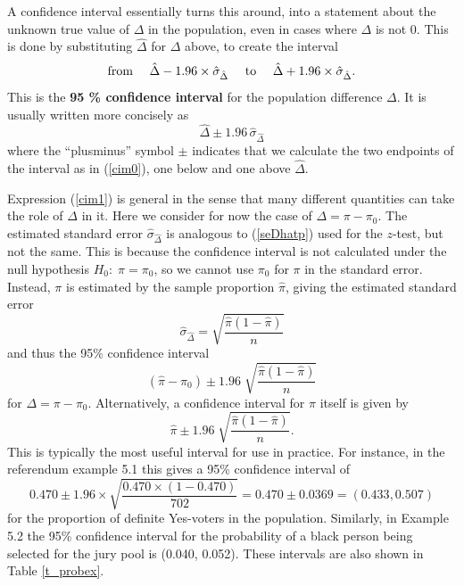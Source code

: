 A confidence interval essentially turns this around, into a statement
about the unknown true value of $\Delta$ in the population, even in
cases where $\Delta$ is not 0.
This is done by substituting $\hat{\Delta}$ for $\Delta$
above, to create the interval
\begin{equation}
\text{from  }\hspace*{1em}
\hat{\Delta} -1.96\times \hat{\sigma}_{\hat{\Delta}}
\hspace*{1em}\text{  to  }\hspace*{1em}
\hat{\Delta}
+1.96\times \hat{\sigma}_{\hat{\Delta}}.
\label{cim0}
\end{equation}
This is the \textbf{95 \% confidence interval} for the population
difference $\Delta$. It is
usually written more concisely as
\begin{equation}
\hat{\Delta}
\pm 1.96\, \hat{\sigma}_{\hat{\Delta}}
\label{cim1}
\end{equation}
where the ``plusminus'' symbol $\pm$ indicates that we calculate the two
endpoints of the interval as in (\ref{cim0}), one below and one above
$\hat{\Delta}$.

Expression (\ref{cim1}) is general in the sense that many different
quantities can take the role of $\Delta$ in it. Here we consider for now
the case of $\Delta=\pi-\pi_{0}$. The estimated standard error
$\hat{\sigma}_{\hat{\Delta}}$ is analogous to
(\ref{seDhatp}) used for the $z$-test, but not the same.
This is because the confidence interval
is not calculated under the null hypothesis $H_{0}:\; \pi=\pi_{0}$, so
we cannot use $\pi_{0}$ for $\pi$ in the standard error. Instead, $\pi$
is estimated by the sample proportion $\hat{\pi}$, giving the estimated
standard error
\begin{equation}
\hat{\sigma}_{\hat{\Delta}} = \sqrt{
\frac{\hat{\pi}(1-\hat{\pi})}{n}
}
\label{sephat2}
\end{equation}
and thus the 95\% confidence interval
\[
(\hat{\pi}-\pi_{0}) \pm 1.96 \;
\sqrt{
\frac{\hat{\pi}(1-\hat{\pi})}{n}}
\]
for $\Delta=\pi-\pi_{0}$. Alternatively, a confidence interval for
$\pi$ itself is given by
\begin{equation}
\hat{\pi} \pm 1.96 \;
\sqrt{
\frac{\hat{\pi}(1-\hat{\pi})}{n}}.
\label{cip2}
\end{equation}
This is typically the most useful interval for use in practice.
For instance, in the referendum example 5.1 this
gives a 95\% confidence interval of
\[
0.470\pm 1.96\times \sqrt{\frac{0.470\times(1-0.470)}{702}}
=0.470\pm 0.0369=(0.433, 0.507)
\]
for the proportion of definite Yes-voters in the population. Similarly,
in Example 5.2 the 95\% confidence interval for the probability of a
black person being selected for the jury pool is (0.040, 0.052). These
intervals are also shown in Table \ref{t_probex}.

